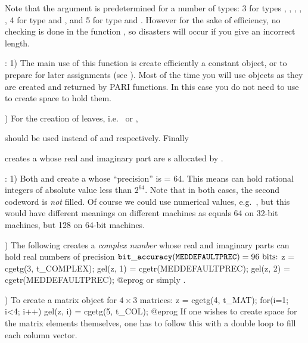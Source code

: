 Note that the argument  is predetermined for a number of types:
3 for types , , , ,
, 4 for type  and , and 5 for type 
and . However for the sake of efficiency, no checking is done in the
function , so disasters will occur if you give an incorrect
length.

: 1)  The main use of this function is create efficiently
a constant object, or to prepare for later assignments (see
). Most of the time you will use  objects as they
are created and returned by PARI functions. In this case you do not need to
use  to create space to hold them.

) For the creation of leaves, i.e.~ or ,



\noindent should be used instead of  and
 respectively. Finally


\noindent creates a  whose real and imaginary part are
s allocated by .

: 1) Both  and
 create a  whose ``precision'' is
 = 64. This means  can hold rational
integers of absolute value less than $2^{64}$. Note that in both cases, the
second codeword is \emph{not} filled. Of course we could use numerical
values, e.g.~, but this would have different meanings on
different machines as  equals 64 on 32-bit machines,
but 128 on 64-bit machines.

) The following creates a \emph{complex number} whose real and
imaginary parts can hold real numbers of precision
${\tt bit\_accuracy(MEDDEFAULTPREC)} = 96\hbox{ bits:}$
%
\bprog
  z = cgetg(3, t_COMPLEX);
  gel(z, 1) = cgetr(MEDDEFAULTPREC);
  gel(z, 2) = cgetr(MEDDEFAULTPREC);
@eprog\noindent
or simply .

) To create a matrix object for $4\times 3$ matrices:
%
\bprog
  z = cgetg(4, t_MAT);
  for(i=1; i<4; i++) gel(z, i) = cgetg(5, t_COL);
@eprog
%
\noindent If one wishes to create space for the matrix elements themselves,
one has to follow this with a double loop to fill each column vector.

